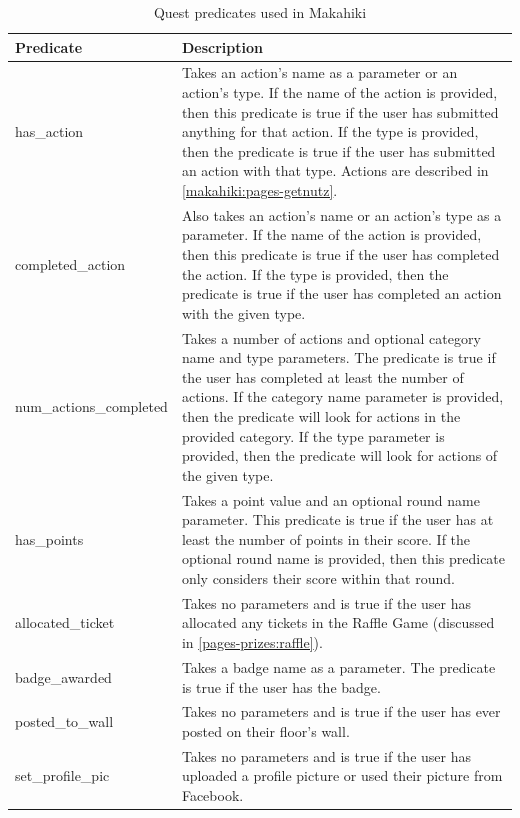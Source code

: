 \begin{table}[t!]
	\begin{tabular}{| l || p{11cm} |}
		\hline
		Predicate & Description \\
		\hline
		has\_action & Takes an action's name as a parameter or an action's type. If the name of the action is provided, then this predicate is true if the user has submitted anything for that action. If the type is provided, then the predicate is true if the user has submitted an action with that type. Actions are described in \autoref{makahiki:pages-getnutz}. \\
		completed\_action & Also takes an action's name or an action's type as a parameter. If the name of the action is provided, then this predicate is true if the user has completed the action. If the type is provided, then the predicate is true if the user has completed an action with the given type.\\
		num\_actions\_completed & Takes a number of actions and optional category name and type parameters. The predicate is true if the user has completed at least the number of actions. If the category name parameter is provided, then the predicate will look for actions in the provided category. If the type parameter is provided, then the predicate will look for actions of the given type.\\ 
		has\_points & Takes a point value and an optional round name parameter. This predicate is true if the user has at least the number of points in their score. If the optional round name is provided, then this predicate only considers their score within that round.\\
		allocated\_ticket & Takes no parameters and is true if the user has allocated any tickets in the Raffle Game (discussed in \autoref{pages-prizes:raffle}).\\
		badge\_awarded & Takes a badge name as a parameter. The predicate is true if the user has the badge.\\
		posted\_to\_wall & Takes no parameters and is true if the user has ever posted on their floor's wall.\\
		set\_profile\_pic & Takes no parameters and is true if the user has uploaded a profile picture or used their picture from Facebook.\\
		\hline
	\end{tabular}
	\caption{Quest predicates used in Makahiki}
	\label{table:quest-predicates}
\end{table}

